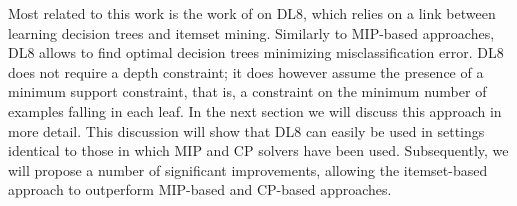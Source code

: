 Most related to this work is the work of \cite{nijssen:2007mining,nijssen:2010optimal} %
on DL8, which relies on a link between learning decision trees and itemset mining. Similarly to MIP-based approaches, DL8 allows to find optimal decision trees minimizing misclassification error. DL8 does not require a depth constraint; it does however assume the presence of a minimum support constraint, that is, a constraint on the minimum number of examples falling in each leaf. In the next section we will discuss this approach in more detail. This discussion will show that DL8 can easily be used in settings identical to those in which MIP and CP solvers have been used. Subsequently, we will propose a number of significant improvements, allowing the itemset-based approach to outperform MIP-based and CP-based approaches.

